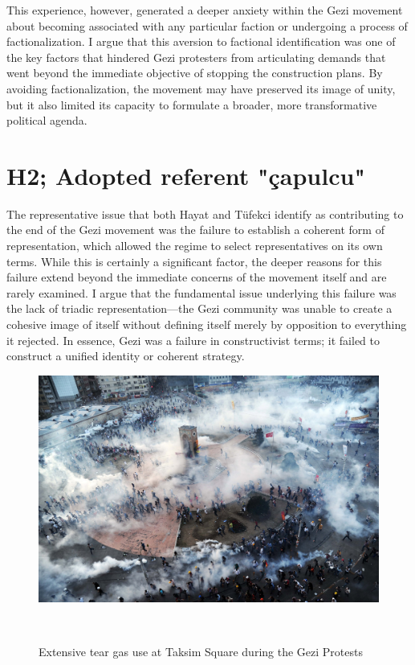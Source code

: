This experience, however, generated a deeper anxiety within the Gezi movement about becoming associated with any particular faction or undergoing a process of factionalization. I argue that this aversion to factional identification was one of the key factors that hindered Gezi protesters from articulating demands that went beyond the immediate objective of stopping the construction plans. By avoiding factionalization, the movement may have preserved its image of unity, but it also limited its capacity to formulate a broader, more transformative political agenda.

\section{H2; Adopted referent "çapulcu"}

The representative issue that both Hayat \parencite*[1041]{hayat2022} and Tüfekci \parencite*[72]{tufekci2020} identify as contributing to the end of the Gezi movement was the failure to establish a coherent form of representation, which allowed the regime to select representatives on its own terms. While this is certainly a significant factor, the deeper reasons for this failure extend beyond the immediate concerns of the movement itself and are rarely examined. I argue that the fundamental issue underlying this failure was the lack of triadic representation—the Gezi community was unable to create a cohesive image of itself without defining itself merely by opposition to everything it rejected. In essence, Gezi was a failure in constructivist terms; it failed to construct a unified identity or coherent strategy.

\begin{figure} \includegraphics[scale=0.32]{teargas.jpg} \caption{Extensive tear gas use at Taksim Square during the Gezi Protests}\ \end{figure}

